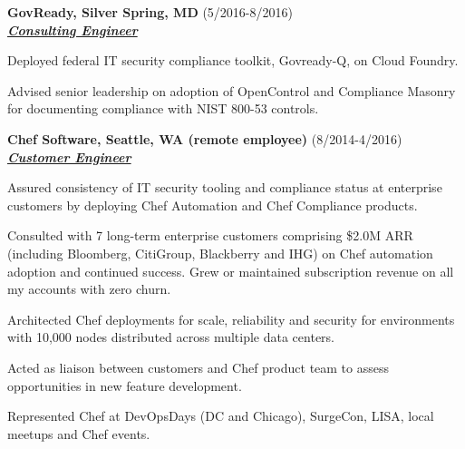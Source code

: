\documentclass{article}
\newcommand{\employer}[3]{{ \textbf{#1} (#2)\\ \underline{\textbf{\emph{#3}}}\\ \nopagebreak }}
\newenvironment{achievements}{\begin{list}{\topsep 0pt \itemsep -2pt}} {\vspace*{4pt}\end{list}}
\begin{document}
\employer{GovReady, Silver Spring, MD}{5/2016-8/2016}{Consulting Engineer}
\begin{achievements}
  \item Deployed federal IT security compliance toolkit, Govready-Q, on Cloud Foundry.
  \item Advised senior leadership on adoption of OpenControl and Compliance Masonry for 
  documenting compliance with NIST 800-53 controls.
\end{achievements}

\employer{Chef Software, Seattle, WA (remote employee)}{8/2014-4/2016}{Customer Engineer}
\begin{achievements}
  \item Assured consistency of IT security tooling and compliance status at enterprise customers by deploying Chef Automation and Chef Compliance products.
  \item Consulted with 7 long-term enterprise customers comprising \$2.0M ARR (including Bloomberg, CitiGroup, Blackberry and IHG) on Chef automation adoption and continued success. Grew or maintained subscription revenue on all my accounts with zero churn.
  \item Architected Chef deployments for scale, reliability and security for environments with 10,000 nodes distributed across multiple data centers.
  \item Acted as liaison between customers and Chef product team to assess opportunities in new feature development.
  \item Represented Chef at DevOpsDays (DC and Chicago), SurgeCon, LISA, local meetups and Chef events.
\end{achievements}
\end{document}
